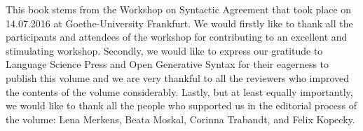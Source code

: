 This book stems from the Workshop on Syntactic Agreement that took place on 14.07.2016 at Goethe-University Frankfurt.  We would firstly like to thank all the participants and attendees of the workshop for contributing to an excellent and stimulating workshop. Secondly, we would like to express our gratitude to Language Science Press and Open Generative Syntax for their eagerness to publish this volume and we are very thankful to all the reviewers who improved the contents of the volume considerably. Lastly, but at least equally importantly, we would like to thank all the people who supported us in the editorial  process of the volume: Lena Merkens, Beata Moskal, Corinna Trabandt, and Felix Kopecky.
